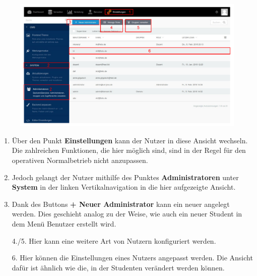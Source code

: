   \begin{figure}
  	\centering
  	\includegraphics[scale=0.5]{backend/img/settings_1.pdf}
  \end{figure}
  \begin{enumerate}
   \item Über den Punkt \textbf{Einstellungen} kann der Nutzer in diese Ansicht wechseln.
	 Die zahlreichen Funktionen, die hier möglich sind, sind in der Regel für den operativen Normalbetrieb nicht anzupassen.
   \item Jedoch gelangt der Nutzer mithilfe des Punktes \textbf{Administratoren} unter \textbf{System} in der linken Vertikalnavigation in die hier aufgezeigte Ansicht.
   \item Dank des Buttons \textbf{+ Neuer Administrator} kann ein neuer angelegt werden. 
	 Dies geschieht analog zu der Weise, wie auch ein neuer Student in dem Menü Benutzer erstellt wird.
   \item[4./5.] Hier kann eine weitere Art von Nutzern konfiguriert werden.
   \item[6.] Hier können die Einstellungen eines Nutzers angepasst werden. 
	 Die Ansicht dafür ist ähnlich wie die, in der Studenten verändert werden können.
  \end{enumerate}

    